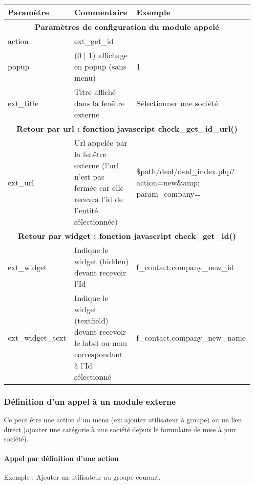 \begin{tabular}{|p{2.5cm}|p{6cm}|p{4.5cm}|}
\hline
\textbf{Paramètre} & \textbf{Commentaire} & \textbf{Exemple} \\
\hline
\multicolumn{3}{|c|}{\textbf{Paramètres de configuration du module appelé}}\\
\hline
action & ext\_get\_id & \\
\hline
popup & (0 | 1) affichage en popup (sans menu) & 1 \\
\hline
ext\_title & Titre affiché dans la fenêtre externe & Sélectionner une société\\
\hline
\multicolumn{3}{|c|}{\textbf{Retour par url : fonction javascript check\_get\_id\_url()}}\\
\hline
ext\_url & Url appelée par la fenêtre externe (l'url n'est pas fermée car elle recevra l'id de l'entité sélectionnée) & \$path/deal/deal\_index.php? action=new\&amp; param\_company= \\
\hline
\multicolumn{3}{|c|}{\textbf{Retour par widget : fonction javascript check\_get\_id()}}\\
\hline
ext\_widget & Indique le widget (hidden) devant recevoir l'Id & f\_contact.company\_new\_id \\
\hline
ext\_widget\_text & Indique le widget (textfield) devant recevoir le label ou nom correspondant à l'Id sélectionné & f\_contact.company\_new\_name \\
\hline
\end{tabular}


\subsubsection{Définition d'un appel à un module externe}

Ce peut être une action d'un menu (ex: ajouter utilisateur à groupe) ou un lien direct (ajouter une catégorie à une société depuis le formulaire de mise à jour société).

\paragraph{Appel par définition d'une action}
Exemple : Ajouter un utilisateur au groupe courant.\\

